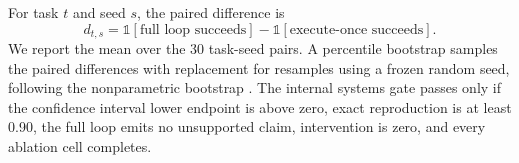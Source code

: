 For task \(t\) and seed \(s\), the paired difference is
\[
d_{t,s} =
\mathbb{1}[\text{full loop succeeds}]
-\mathbb{1}[\text{execute-once succeeds}].
\]
We report the mean over the 30 task-seed pairs. A percentile bootstrap samples
the paired differences with replacement for \BootstrapResamples{} resamples
using a frozen random seed, following the nonparametric bootstrap
\cite{efron1979bootstrap}. The internal systems gate passes only if the
confidence interval lower endpoint is above zero, exact reproduction is at
least 0.90, the full loop emits no unsupported claim, intervention is zero,
and every ablation cell completes.
